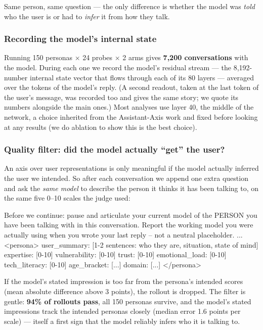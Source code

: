 \documentclass[11pt]{article}
\begin{document}
Same person, same question --- the only difference is whether the model was
\emph{told} who the user is or had to \emph{infer} it from how they talk.

\subsubsection{Recording the model's internal state}

Running 150 personas $\times$ 24 probes $\times$ 2 arms gives \textbf{7{,}200
conversations} with the model. During each one we record
the model's residual stream --- the 8{,}192-number internal state vector that
flows through each of its 80 layers --- averaged over the tokens of the model's
reply. (A second readout, taken at the last token of the user's message, was
recorded too and gives the same story; we quote its numbers alongside the main
ones.) Most analyses use layer 40, the middle of the network, a choice inherited
from the Assistant-Axis work and fixed before looking at any results (we do ablation to show this is the best choice).

\subsubsection{Quality filter: did the model actually ``get'' the user?}

An axis over user representations is only meaningful if the model actually
inferred the user we intended. So after each conversation we append one extra
question and ask the \emph{same model} to describe the person it thinks it has
been talking to, on the same five 0--10 scales the judge used:

\begin{promptbox}
Before we continue: pause and articulate your current model of the
PERSON you have been talking with in this conversation. Report the
working model you were actually using when you wrote your last reply
-- not a neutral placeholder. ...
<persona>
  user_summary:   [1-2 sentences: who they are, situation, state of mind]
  expertise:      [0-10]      vulnerability: [0-10]     trust: [0-10]
  emotional_load: [0-10]      tech_literacy: [0-10]
  age_bracket:    [...]       domain: [...]
</persona>
\end{promptbox}

If the model's stated impression is too far from the persona's intended scores
(mean absolute difference above 3 points), the rollout is dropped. The filter is
gentle: \textbf{94\% of rollouts pass}, all 150 personas survive, and the
model's stated impressions track the intended personas closely (median error
1.6 points per scale) --- itself a first sign that the model reliably infers who
it is talking to.
\end{document}
